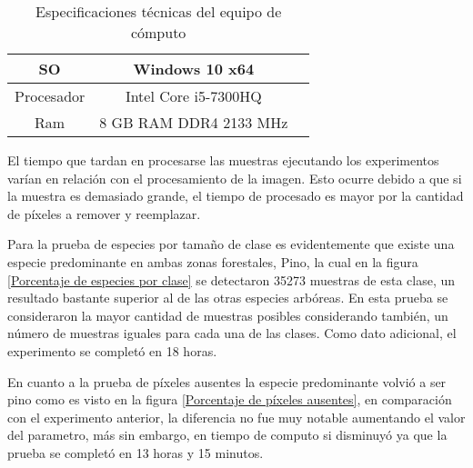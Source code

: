 \begin{table}[H]
	{\centering
		\begin{tabular}{|c|c|c|}
			\hline
			SO & Windows 10 x64\\
			\hline
			Procesador & Intel Core i5-7300HQ\\
			\hline
			Ram & 8 GB RAM DDR4 2133 MHz\\
			\hline
		\end{tabular}
	\caption{Especificaciones técnicas del equipo de cómputo}
	\label{tab:Especificaciones técnicas del PC}
	}
\end{table}


El tiempo que tardan en procesarse las muestras ejecutando los experimentos varían en relación con el procesamiento de la imagen. Esto ocurre debido a que si la muestra es demasiado grande, el tiempo de procesado es mayor por la cantidad de píxeles a remover y reemplazar. 


Para la prueba de especies por tamaño de clase es evidentemente que existe una especie predominante en ambas zonas forestales, Pino, la cual en la figura \ref{Porcentaje de especies por clase} se detectaron 35273 muestras de esta clase, un resultado bastante superior al de las otras especies arbóreas. En esta prueba se consideraron la mayor cantidad de muestras posibles considerando también, un número de muestras iguales para cada una de las clases. Como dato adicional, el experimento se completó en 18 horas.

En cuanto a la prueba de píxeles ausentes la especie predominante volvió a ser pino como es visto en la figura \ref{Porcentaje de píxeles ausentes}, en comparación con el experimento anterior, la diferencia no fue muy notable aumentando el valor del parametro, más sin embargo, en tiempo de computo si disminuyó ya que la prueba se completó en 13 horas y 15 minutos.

